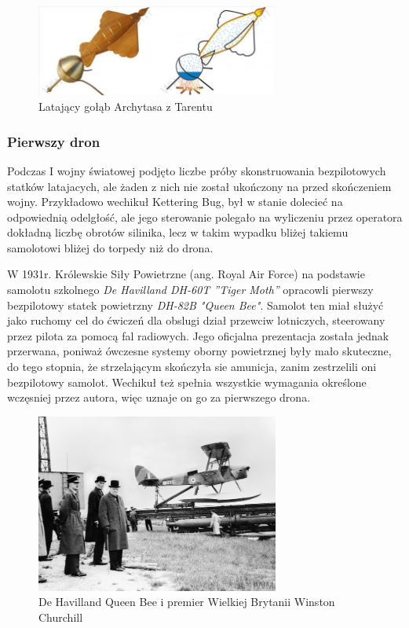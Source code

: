 \begin{figure}[!ht]
  \centering
  \includegraphics[width=8cm]{./Obrazy/golab.jpg}
  \caption{Latający gołąb Archytasa z Tarentu}
  \end{figure}

\subsubsection{Pierwszy dron}

\hspace{1cm}Podczas I wojny światowej podjęto liczbe próby skonstruowania bezpilotowych statków latajacych, ale żaden z nich nie został ukończony na przed skończeniem wojny. Przykładowo wechikuł Kettering Bug, był w stanie dolecieć na odpowiednią odelgłość, ale jego sterowanie polegało na wyliczeniu przez operatora dokładną liczbę obrotów silinika, lecz w takim wypadku bliżej takiemu samolotowi bliżej do torpedy niż do drona. 

W 1931r. Królewskie Siły Powietrzne (ang. Royal Air Force) na podstawie samolotu szkolnego \textit{De Havilland DH-60T ”Tiger Moth”} opracowli pierwszy bezpilotowy statek powietrzny \textit{DH-82B "Queen Bee"}. Samolot ten miał służyć jako ruchomy cel do ćwiczeń dla obslugi dział przewciw lotniczych, steerowany przez pilota za pomocą fal radiowych. Jego oficjalna prezentacja została jednak przerwana, poniważ ówczesne systemy oborny powietrznej były mało skuteczne, do tego stopnia, że strzelającym skończyła sie amunicja, zanim zestrzelili oni bezpilotowy samolot. Wechikuł też spełnia wszystkie wymagania określone wczęsniej przez autora, więc uznaje on go za pierwszego drona.\cite{queen-bee}\cite{dron-ibuk}

\begin{figure}[!ht]
  \centering
  \includegraphics[width=8cm]{./Obrazy/queen-bee.jpg}
  \caption{De Havilland Queen Bee i premier Wielkiej Brytanii Winston Churchill}
  \end{figure}

